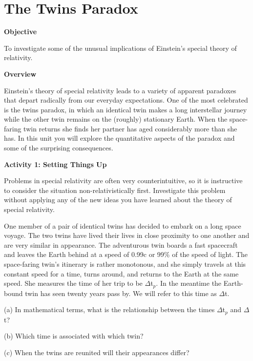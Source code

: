 
\section{The Twins Paradox}

\makelabheader %

\textbf{Objective}

To investigate some of the unusual implications of Einstein's special
theory of relativity.

\textbf{Overview}

Einstein's theory of special relativity leads to a variety of apparent
paradoxes that depart radically from our everyday expectations. One
of the most celebrated is the twins paradox, in which an identical
twin makes a long interstellar journey while the other twin remains
on the (roughly) stationary Earth. When the space-faring twin returns
she finds her partner has aged considerably more than she has. In
this unit you will explore the quantitative aspects of the paradox
and some of the surprising consequences.

\textbf{Activity 1: Setting Things Up}

Problems in special relativity are often very counterintuitive, so
it is instructive to consider the situation non-relativistically first.
Investigate this problem without applying any of the new ideas you
have learned about the theory of special relativity.

One member of a pair of identical twins has decided to embark on a
long space voyage. The two twins have lived their lives in close proximity
to one another and are very similar in appearance. The adventurous
twin boards a fast spacecraft and leaves the Earth behind at a speed
of 0.99c or 99\% of the speed of light. The space-faring twin's itinerary
is rather monotonous, and she simply travels at this constant speed
for a time, turns around, and returns to the Earth at the same speed.
She measures the time of her trip to be \( \Delta  \)t\( _{p} \).
In the meantime the Earth-bound twin has seen twenty years pass by.
We will refer to this time as \( \Delta  \)t.

(a) In mathematical terms, what is the relationship between the times
\( \Delta  \)t\( _{p} \) and \( \Delta  \)t?
\vspace{15mm}

(b) Which time is associated with which twin?
\vspace{15mm}

(c) When the twins are reunited will their appearances differ?
\vspace{15mm}

